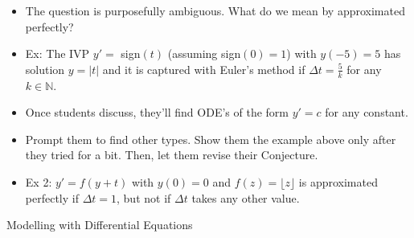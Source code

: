 \begin{annotation}
	\begin{goals}
		\begin{itemize}
			\item The question is purposefully ambiguous.
				What do we mean by approximated perfectly?
		
			\item Ex: The IVP $y'=$ sign$(t)$ (assuming sign$(0)=1$) with $y(-5)=5$ has solution $y = |t|$ and it is captured with Euler's method if $\Delta t=\frac5k$ for any $k\in\mathbb{N}$. \\
		
			\item Once students discuss, they'll find ODE's of the form $y'= c$ for any constant. 
		
			\item Prompt them to find other types. Show them the example above only after they tried for a bit. 
				Then, let them revise their Conjecture.  \\
		
			\item Ex 2: $y'=f(y+t)$ with $y(0)=0$ and $f(z) = \lfloor z \rfloor$ is approximated perfectly if $\Delta t = 1$, but not if $\Delta t$ takes any other value.
		\end{itemize}
	\end{goals}
\end{annotation}








\standardonlynewpage






%
%
%
%
%
%
%



\begin{module}{Modelling with Differential Equations}
	\label{ODE:model}

	
	
\end{module}



